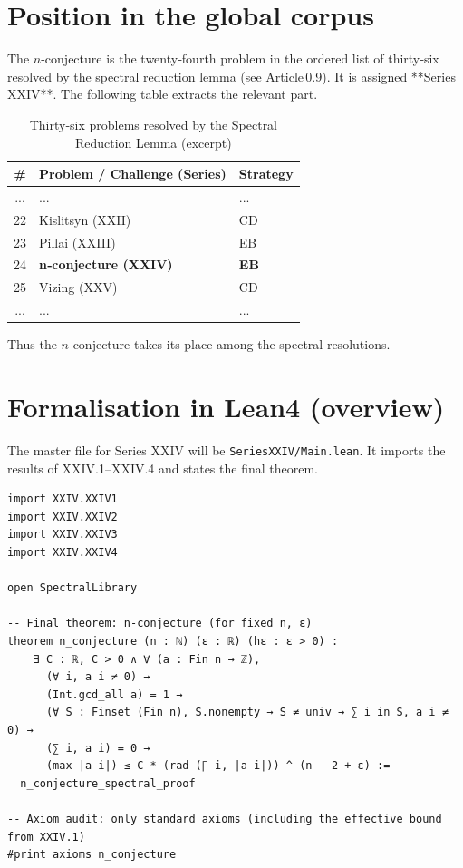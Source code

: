 \documentclass[11pt,a4paper]{article}
\begin{document}
\section{Position in the global corpus}

The $n$-conjecture is the twenty‑fourth problem in the ordered list of thirty‑six resolved by the spectral reduction lemma (see Article 0.9). It is assigned **Series XXIV**. The following table extracts the relevant part.

\begin{center}
\begin{longtable}{@{}cll@{}}
\caption{Thirty‑six problems resolved by the Spectral Reduction Lemma (excerpt)}\\
\toprule
\# & Problem / Challenge (Series) & Strategy \\
\midrule
... & ... & ... \\
22 & Kislitsyn (XXII) & CD \\
23 & Pillai (XXIII) & EB \\
24 & \textbf{n‑conjecture (XXIV)} & \textbf{EB} \\
25 & Vizing (XXV) & CD \\
... & ... & ... \\
\bottomrule
\end{longtable}
\end{center}

Thus the $n$-conjecture takes its place among the spectral resolutions.

\section{Formalisation in Lean4 (overview)}

The master file for Series XXIV will be \texttt{SeriesXXIV/Main.lean}. It imports the results of XXIV.1–XXIV.4 and states the final theorem.

\begin{lstlisting}[style=lean, caption={MainXXIV.lean (sketch)}]
import XXIV.XXIV1
import XXIV.XXIV2
import XXIV.XXIV3
import XXIV.XXIV4

open SpectralLibrary

-- Final theorem: n‑conjecture (for fixed n, ε)
theorem n_conjecture (n : ℕ) (ε : ℝ) (hε : ε > 0) :
    ∃ C : ℝ, C > 0 ∧ ∀ (a : Fin n → ℤ),
      (∀ i, a i ≠ 0) →
      (Int.gcd_all a) = 1 →
      (∀ S : Finset (Fin n), S.nonempty → S ≠ univ → ∑ i in S, a i ≠ 0) →
      (∑ i, a i) = 0 →
      (max |a i|) ≤ C * (rad (∏ i, |a i|)) ^ (n - 2 + ε) :=
  n_conjecture_spectral_proof

-- Axiom audit: only standard axioms (including the effective bound from XXIV.1)
#print axioms n_conjecture
\end{lstlisting}
\end{document}
